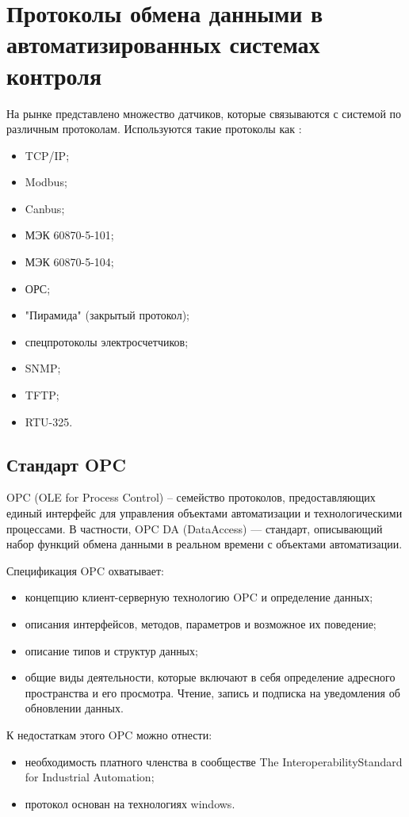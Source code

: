 \newpage
\section{Протоколы обмена данными в автоматизированных системах контроля}
\setcounter{figure}{0}

На рынке представлено множество датчиков, которые связываются с системой по различным протоколам. Используются такие протоколы как \cite{csp}:
\begin{itemize}
\item TCP/IP;
\item Modbus;
\item Canbus;
\item МЭК 60870-5-101;
\item МЭК 60870-5-104;
\item ОРС;
\item "Пирамида" (закрытый протокол);
\item спецпротоколы электросчетчиков;
\item SNMP;
\item TFTP;
\item RTU-325.
\end{itemize}

\subsection{Стандарт OPC}

OPC (OLE for Process Control) – семейство протоколов, предоставляющих единый интерфейс для управления объектами автоматизации и технологическими процессами. В частности, OPC DA (DataAccess) — стандарт, описывающий набор функций обмена данными в реальном времени с объектами автоматизации. 

Спецификация OPC охватывает:
\begin{itemize}
 \item концепцию клиент-серверную технологию OPC и определение данных;
 \item описания интерфейсов, методов, параметров и возможное их поведение;
 \item описание типов и структур данных;
 \item общие виды деятельности, которые включают в себя определение адресного пространства и его просмотра. Чтение, запись и подписка на уведомления об обновлении данных.
\end{itemize}

К недостаткам этого OPC можно отнести:
\begin{itemize}
 \item необходимость платного членства в сообществе The InteroperabilityStandard for Industrial Automation;
 \item протокол основан на технологиях windows.
\end{itemize}

